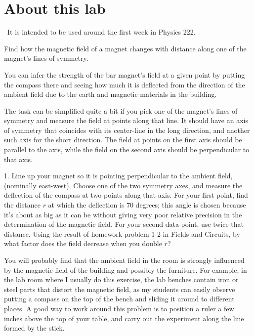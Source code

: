 \renewcommand\thechapter{c2.1}
\label{lab:field-of-a-permanent-magnet}

\section*{About this lab}

\covid\ 
It is intended to be used around the first week in Physics 222.

\apparatus
{}

\begin{goals}

\item[] Find how the magnetic field of a magnet changes with
distance along one of the magnet's lines of symmetry.

\end{goals}

You can infer the strength of the bar magnet's field at a
given point by putting the compass there and seeing how
much it is deflected from the direction of the ambient
field due to the earth and magnetic materials in the building.

The task can be simplified quite a bit if you pick one of the
magnet's lines of symmetry and measure the field at points
along that line. It should have
an axis of symmetry that coincides with its center-line
in the long direction, and another such axis for the short direction.
The field at points on the first axis should be parallel to the axis,
while the field on the second axis should be perpendicular to that axis.

1. Line up your magnet so it is pointing perpendicular to the ambient field,
(nominally east-west). Choose one
of the two symmetry axes, and measure the
deflection of the compass at two points along that axis.
For your first point, find the
distance $r$ at which the deflection is 70 degrees; this angle is chosen because
it's about as big as it can be without giving very poor relative precision 
in the determination of the magnetic field. For your second data-point,
use twice that distance. Using the result of homework problem 
1-2 in Fields and Circuits, by what factor does the field decrease
when you double $r$?

You will probably find that the ambient field in the room is strongly
influenced by the magnetic field of the building and possibly the
furniture.  For example, in the lab room where I usually do this
exercise, the lab benches contain iron or steel parts that distort the
magnetic field, as my students can easily observe putting a compass on
the top of the bench and sliding it around to different places. 
A good way to work around this problem is to position a ruler a few 
inches above the top of your table, and carry out the experiment along the line
formed by the stick.

